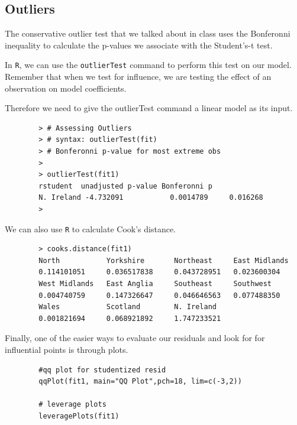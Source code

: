 \documentclass[residuals.tex]{subfiles}
\begin{document}
	\bigskip
	\subsection*{Outliers}
	
	
	
	
	The conservative outlier test that we talked about in class uses the
	Bonferonni inequality to calculate the p-values we associate with the
	Student's-t test. 
	
	In \texttt{R}, we can use the \texttt{outlierTest} command to perform this
	test on our model. Remember that when we test for influence, we are testing
	the effect of an observation on model coefficients. 
	
	Therefore we need to
	give the outlierTest command a linear model as its input.
	\begin{framed}
		\begin{verbatim}
		> # Assessing Outliers
		> # syntax: outlierTest(fit) 
		> # Bonferonni p-value for most extreme obs
		>
		> outlierTest(fit1)
		rstudent  unadjusted p-value Bonferonni p
		N. Ireland -4.732091           0.0014789     0.016268
		> 
		\end{verbatim}
	\end{framed}
	\noindent We can also use \texttt{R} to calculate Cook's distance. 
	\begin{framed}
		\begin{verbatim}
		> cooks.distance(fit1)
		North           Yorkshire       Northeast     East Midlands 
		0.114101051     0.036517838     0.043728951   0.023600304 
		West Midlands   East Anglia     Southeast     Southwest 
		0.004740759     0.147326647     0.046646563   0.077488350 
		Wales           Scotland        N. Ireland 
		0.001821694     0.068921892     1.747233521 
		\end{verbatim}
	\end{framed}
	
	Finally, one of the easier ways to evaluate our residuals and look for
	for influential points is through plots. 
	
	\begin{framed}
		\begin{verbatim}
		#qq plot for studentized resid 
		qqPlot(fit1, main="QQ Plot",pch=18, lim=c(-3,2)) 
		
		# leverage plots
		leveragePlots(fit1) 
		\end{verbatim}
	\end{framed}
	
\end{document}
